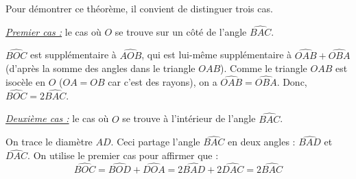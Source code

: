 \begin{preuve}
Pour démontrer ce théorème, il convient de distinguer trois cas.

\underline{\textit{Premier cas :}} le cas où $O$ se trouve sur un côté de l'angle $\widehat{BAC}$.
\begin{figure}[H]
\end{figure}
$\widehat{BOC}$ est supplémentaire à $\widehat{AOB}$, qui est lui-même supplémentaire à $\widehat{OAB}+\widehat{OBA}$ (d'après la somme des angles dans le triangle $OAB$). Comme le triangle $OAB$ est isocèle en $O$ ($OA=OB$ car c'est des rayons), on a $\widehat{OAB}=\widehat{OBA}$. Donc, $\widehat{BOC}=2\widehat{BAC}$.

\underline{\textit{Deuxième cas :}} le cas où $O$ se trouve à l'intérieur de l'angle $\widehat{BAC}$.
\begin{figure}[H]
\end{figure}
On trace le diamètre $AD$. Ceci partage l'angle $\widehat{BAC}$ en deux angles : $\widehat{BAD}$ et $\widehat{DAC}$. On utilise le premier cas pour affirmer que :
$$\widehat{BOC}=\widehat{BOD}+\widehat{DOA}=2\widehat{BAD}+2\widehat{DAC}=2\widehat{BAC}$$


\end{preuve}
